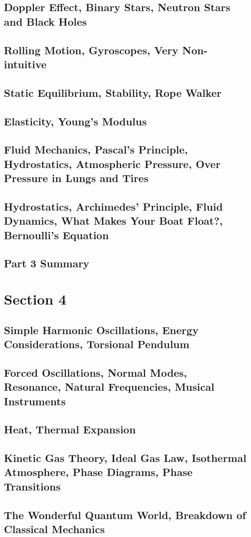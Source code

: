 \documentclass[../introphysics.tex]{subfiles}
\begin{document}
\section{Doppler Effect, Binary Stars, Neutron Stars and Black Holes}
\section{Rolling Motion, Gyroscopes, Very Non-intuitive}
\section{Static Equilibrium, Stability, Rope Walker}
\section{Elasticity, Young's Modulus}
\section{Fluid Mechanics, Pascal's Principle, Hydrostatics, Atmospheric Pressure, Over Pressure in Lungs and Tires}
\section{Hydrostatics, Archimedes' Principle, Fluid Dynamics, What Makes Your Boat Float?, Bernoulli's Equation}
\section{Part 3 Summary}
\chapter{Section 4}
\section{Simple Harmonic Oscillations, Energy Considerations, Torsional Pendulum}
\section{Forced Oscillations, Normal Modes, Resonance, Natural Frequencies, Musical Instruments}
\section{Heat, Thermal Expansion}
\section{Kinetic Gas Theory, Ideal Gas Law, Isothermal Atmosphere, Phase Diagrams, Phase Transitions}
\section{The Wonderful Quantum World, Breakdown of Classical Mechanics}
\end{document}

